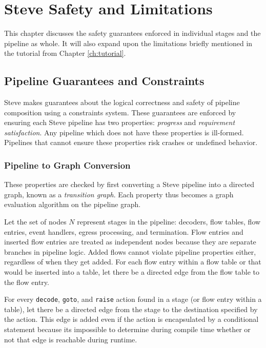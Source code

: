 \chapter{Steve Safety and Limitations} \label{ch:limits}

This chapter discusses the safety guarantees enforced in individual stages
and the pipeline as whole. It will also expand upon the limitations
briefly mentioned in the tutorial from Chapter \ref{ch:tutorial}.

\section{Pipeline Guarantees and Constraints} \label{guide:pipeline_checking}

Steve makes guarantees about the logical correctness and safety of pipeline 
composition using a constraints system. These guarantees are enforced by ensuring each Steve pipeline has two  properties: \textit{progress} and \textit{requirement satisfaction}. Any 
pipeline which does not have these properties is ill-formed. 
Pipelines that cannot ensure these properties risk crashes or undefined behavior.

\subsection{Pipeline to Graph Conversion} \label{guide:pipeline_graph}

These properties are checked by first converting a Steve pipeline into a directed graph, known as a \emph{transition graph}. Each property thus becomes a graph evaluation algorithm on the pipeline graph. 

Let the set of nodes $N$ represent stages in the pipeline: decoders, flow tables, flow entries, event handlers, egress processing, and termination.
Flow entries and inserted flow entries are treated as independent nodes because they are separate branches in pipeline logic.
Added flows cannot violate pipeline properties either, regardless of when they get added.
For each flow entry within a flow table or that would be inserted into a table, let there be a directed edge from the flow table to the flow entry.

For every \texttt{decode}, \texttt{goto}, and \texttt{raise} action found in a stage 
(or flow entry within a table), let there be a directed edge from the stage 
to the destination specified by the action. 
This edge is added even if the action is encapsulated by a conditional statement 
because its impossible to determine during compile time whether or not that edge 
is reachable during runtime.

